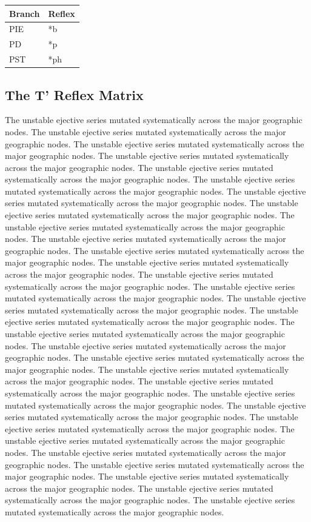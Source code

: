 \begin{table}[h]\centering
\begin{tabular}{ll} \toprule \textbf{Branch} & \textbf{Reflex} \\ \midrule
PIE & *b \\ 
PD & *p \\ 
PST & *ph \\ 
\bottomrule \end{tabular}\end{table}

\subsection{The T' Reflex Matrix}
The unstable ejective series mutated systematically across the major geographic nodes. The unstable ejective series mutated systematically across the major geographic nodes. The unstable ejective series mutated systematically across the major geographic nodes. The unstable ejective series mutated systematically across the major geographic nodes. The unstable ejective series mutated systematically across the major geographic nodes. The unstable ejective series mutated systematically across the major geographic nodes. The unstable ejective series mutated systematically across the major geographic nodes. The unstable ejective series mutated systematically across the major geographic nodes. The unstable ejective series mutated systematically across the major geographic nodes. The unstable ejective series mutated systematically across the major geographic nodes. The unstable ejective series mutated systematically across the major geographic nodes. The unstable ejective series mutated systematically across the major geographic nodes. The unstable ejective series mutated systematically across the major geographic nodes. The unstable ejective series mutated systematically across the major geographic nodes. The unstable ejective series mutated systematically across the major geographic nodes. The unstable ejective series mutated systematically across the major geographic nodes. The unstable ejective series mutated systematically across the major geographic nodes. The unstable ejective series mutated systematically across the major geographic nodes. The unstable ejective series mutated systematically across the major geographic nodes. The unstable ejective series mutated systematically across the major geographic nodes. The unstable ejective series mutated systematically across the major geographic nodes. The unstable ejective series mutated systematically across the major geographic nodes. The unstable ejective series mutated systematically across the major geographic nodes. The unstable ejective series mutated systematically across the major geographic nodes. The unstable ejective series mutated systematically across the major geographic nodes. The unstable ejective series mutated systematically across the major geographic nodes. The unstable ejective series mutated systematically across the major geographic nodes. The unstable ejective series mutated systematically across the major geographic nodes. The unstable ejective series mutated systematically across the major geographic nodes. The unstable ejective series mutated systematically across the major geographic nodes. 

